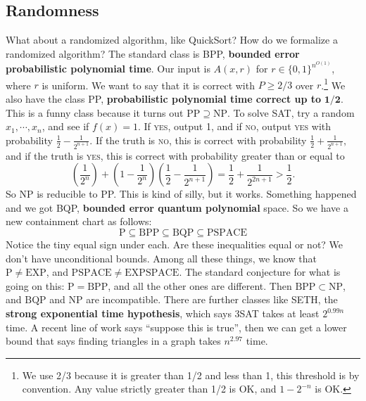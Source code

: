 \subsection*{Randomness}
What about a randomized algorithm, like QuickSort? How do we formalize a randomized algorithm? The standard class is BPP, \textbf{bounded error probabilistic polynomial time}. Our input is $A(x,r)$ for $r \in  \{0,1\} ^{n ^{O(1)}}$, where $r$ is uniform. We want to say that it is correct with $P \geq 2/3$ over $r$.\footnote{We use 2/3 because it is greater than 1/2 and less than 1, this threshold is by convention. Any value strictly greater than 1/2 is OK, and  $1-2 ^{-n}$ is OK.} We also have the class PP, \textbf{probabilistic polynomial time correct up to} $\mathbf 1/\mathbf 2$. This is a funny class because it turns out  $\mathrm{PP}\supseteq \mathrm{NP}$. To solve SAT, try a random $x_1, \cdots , x_n $, and see if $f(x)=1$. If \textsc{yes}, output 1, and if \textsc{no}, output \textsc{yes} with probability $ \frac{1}{2}- \frac{1}{2 ^{n+1}}$. If the truth is \textsc{no}, this is correct with probability $\frac{1}{2}+ \frac{1}{2 ^{n+1}},$ and if the truth is \textsc{yes}, this is correct with probability greater than or equal to \[
    \left( \frac{1}{2^n } \right) + \left( 1 - \frac{1}{2^n } \right) \left( \frac{1}{2}- \frac{1}{2 ^{n+1}} \right) = \frac{1}{2}+ \frac{1}{2 ^{2n+1}} > \frac{1}{2}.
\] So NP is reducible to PP. This is kind of silly, but it works. Something happened and we got BQP, \textbf{bounded error quantum polynomial} space. So we have a new containment chart as follows: \[
\mathrm{P}\subseteq \mathrm{BPP} \subseteq \mathrm{BQP} \subseteq \mathrm{PSPACE}
\] Notice the tiny equal sign under each. Are these inequalities equal or not? We don't have unconditional bounds. Among all these things, we know that $\mathrm{P} \neq \mathrm{EXP}$, and $\mathrm{PSPACE}\neq \mathrm{EXPSPACE}$. The standard conjecture for what is going on this: $\mathrm{P}=\mathrm{BPP}$, and all the other ones are different. Then $\mathrm{BPP}\subset\mathrm{NP}$, and $\mathrm{BQP}$ and $\mathrm{NP}$ are incompatible. There are further classes like SETH, the \textbf{strong exponential time hypothesis}, which says 3SAT takes at least $2 ^{ 0.99 n}$ time. A recent line of work says ``suppose this is true'', then we can get a lower bound that says finding triangles in a graph takes $n ^{2.97}$ time.


